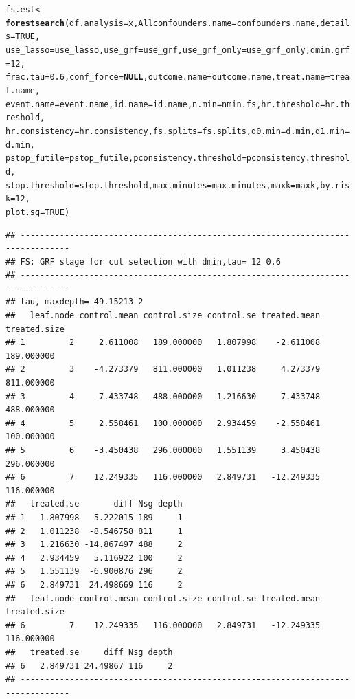 \documentclass[12pt]{article}
\makeatletter
\newcommand{\hlnum}[1]{\textcolor[rgb]{0.686,0.059,0.569}{#1}}%
\newcommand{\hlstd}[1]{\textcolor[rgb]{0.345,0.345,0.345}{#1}}%
\newcommand{\hlkwa}[1]{\textcolor[rgb]{0.161,0.373,0.58}{\textbf{#1}}}%
\newcommand{\hlkwb}[1]{\textcolor[rgb]{0.69,0.353,0.396}{#1}}%
\newcommand{\hlkwc}[1]{\textcolor[rgb]{0.333,0.667,0.333}{#1}}%
\newcommand{\hlkwd}[1]{\textcolor[rgb]{0.737,0.353,0.396}{\textbf{#1}}}%
\newenvironment{kframe}{%
 \def\at@end@of@kframe{}%
 \ifinner\ifhmode%
  \def\at@end@of@kframe{\end{minipage}}%
  \begin{minipage}{\columnwidth}%
 \fi\fi%
 \def\FrameCommand##1{\hskip\@totalleftmargin \hskip-\fboxsep
 \colorbox{shadecolor}{##1}\hskip-\fboxsep
     \hskip-\linewidth \hskip-\@totalleftmargin \hskip\columnwidth}%
 \MakeFramed {\advance\hsize-\width
   \@totalleftmargin\z@ \linewidth\hsize
   \@setminipage}}%
 {\par\unskip\endMakeFramed%
 \at@end@of@kframe}
\newenvironment{knitrout}{}{} %
\makeatother
\begin{document}
\begin{knitrout}
\begin{kframe}
\begin{alltt}
\hlstd{fs.est} \hlkwb{<-} \hlkwd{forestsearch}\hlstd{(}\hlkwc{df.analysis} \hlstd{= x,} \hlkwc{Allconfounders.name} \hlstd{= confounders.name,} \hlkwc{details} \hlstd{=} \hlnum{TRUE}\hlstd{,}
    \hlkwc{use_lasso} \hlstd{= use_lasso,} \hlkwc{use_grf} \hlstd{= use_grf,} \hlkwc{use_grf_only} \hlstd{= use_grf_only,} \hlkwc{dmin.grf} \hlstd{=} \hlnum{12}\hlstd{,}
    \hlkwc{frac.tau} \hlstd{=} \hlnum{0.6}\hlstd{,} \hlkwc{conf_force} \hlstd{=} \hlkwa{NULL}\hlstd{,} \hlkwc{outcome.name} \hlstd{= outcome.name,} \hlkwc{treat.name} \hlstd{= treat.name,}
    \hlkwc{event.name} \hlstd{= event.name,} \hlkwc{id.name} \hlstd{= id.name,} \hlkwc{n.min} \hlstd{= nmin.fs,} \hlkwc{hr.threshold} \hlstd{= hr.threshold,}
    \hlkwc{hr.consistency} \hlstd{= hr.consistency,} \hlkwc{fs.splits} \hlstd{= fs.splits,} \hlkwc{d0.min} \hlstd{= d.min,} \hlkwc{d1.min} \hlstd{= d.min,}
    \hlkwc{pstop_futile} \hlstd{= pstop_futile,} \hlkwc{pconsistency.threshold} \hlstd{= pconsistency.threshold,}
    \hlkwc{stop.threshold} \hlstd{= stop.threshold,} \hlkwc{max.minutes} \hlstd{= max.minutes,} \hlkwc{maxk} \hlstd{= maxk,} \hlkwc{by.risk} \hlstd{=} \hlnum{12}\hlstd{,}
    \hlkwc{plot.sg} \hlstd{=} \hlnum{TRUE}\hlstd{)}
\end{alltt}
\begin{verbatim}
## --------------------------------------------------------------------------------
## FS: GRF stage for cut selection with dmin,tau= 12 0.6 
## --------------------------------------------------------------------------------
## tau, maxdepth= 49.15213 2 
##   leaf.node control.mean control.size control.se treated.mean treated.size
## 1         2     2.611008   189.000000   1.807998    -2.611008   189.000000
## 2         3    -4.273379   811.000000   1.011238     4.273379   811.000000
## 3         4    -7.433748   488.000000   1.216630     7.433748   488.000000
## 4         5     2.558461   100.000000   2.934459    -2.558461   100.000000
## 5         6    -3.450438   296.000000   1.551139     3.450438   296.000000
## 6         7    12.249335   116.000000   2.849731   -12.249335   116.000000
##   treated.se       diff Nsg depth
## 1   1.807998   5.222015 189     1
## 2   1.011238  -8.546758 811     1
## 3   1.216630 -14.867497 488     2
## 4   2.934459   5.116922 100     2
## 5   1.551139  -6.900876 296     2
## 6   2.849731  24.498669 116     2
##   leaf.node control.mean control.size control.se treated.mean treated.size
## 6         7    12.249335   116.000000   2.849731   -12.249335   116.000000
##   treated.se     diff Nsg depth
## 6   2.849731 24.49867 116     2
## --------------------------------------------------------------------------------

\end{verbatim}
\end{kframe}
\end{knitrout}
\end{document}
